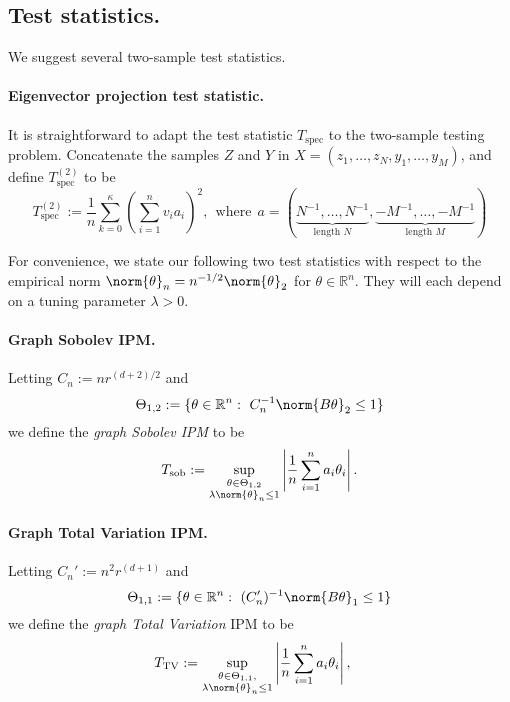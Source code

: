 \documentclass{article}
\newcommand{\Reals}{\mathbb{R}}
\newcommand{\abs}[1]{\left \lvert #1 \right \rvert}
\newcommand{\1}{\mathbf{1}}
\theoremstyle{alden}
\theoremstyle{aldenthm}
\theoremstyle{definition}
\theoremstyle{remark}
\begin{document}
\subsection{Test statistics.}

We suggest several two-sample test statistics. 

\paragraph{Eigenvector projection test statistic.}

It is straightforward to adapt the test statistic $T_{\mathrm{spec}}$ to the two-sample testing problem. Concatenate the samples $Z$ and $Y$ in $X = (z_1,\ldots,z_N,y_1,\ldots,y_M)$, and define $T_{\mathrm{spec}}^{(2)}$ to be
\begin{equation}
\label{eqn:graph_spectral_projections_2}
T_{\mathrm{spec}}^{(2)} := \frac{1}{n} \sum_{k = 0}^{\kappa} \left(\sum_{i = 1}^{n} v_i a_i\right)^2, ~~\textrm{where}~~ a = (\underbrace{N^{-1},\ldots,{N^{-1}}}_{\textrm{length } N},\underbrace{-M^{-1},\ldots,-M^{-1}}_{\textrm{length } M})
\end{equation}

For convenience, we state our following two test statistics with respect to the empirical norm $\norm{\theta}_n = n^{-1/2}\norm{\theta}_2$ for $\theta \in \Reals^n$. They will each depend on a tuning parameter $\lambda > 0$.
\paragraph{Graph Sobolev IPM.}
Letting $C_n := nr^{(d + 2)/2}$ and
\begin{equation*}
\Theta_{1,2} := \{\theta \in \Reals^n:~ C_n^{-1} \norm{B\theta}_2 \leq 1\} 
\end{equation*}
we define the \emph{graph Sobolev IPM} to be
\begin{equation}
\label{eqn:sobolev_IPM}
T_{\textrm{sob}} := \sup_{\substack{\theta \in \Theta_{1,2} \\ \lambda \norm{\theta}_n \leq 1}} \abs{\frac{1}{n}\sum_{i = 1}^{n} a_i \theta_i}. 
\end{equation}

\paragraph{Graph Total Variation IPM.}
Letting $C_n' := n^{2}r^{(d + 1)}$ and 
\begin{equation*}
\Theta_{1,1} := \{\theta \in \Reals^n:~ (C_n')^{-1} \norm{B\theta}_1 \leq 1\}
\end{equation*}
we define the \emph{graph Total Variation} IPM to be
\begin{equation}
\label{eqn:total_variation_IPM}
T_{\mathrm{TV}} := \sup_{\substack{\theta \in \Theta_{1,1}, \\ \lambda \norm{\theta}_n \leq 1} } \abs{\frac{1}{n}\sum_{i = 1}^{n} a_i \theta_i}, \quad
\end{equation}
\end{document}

